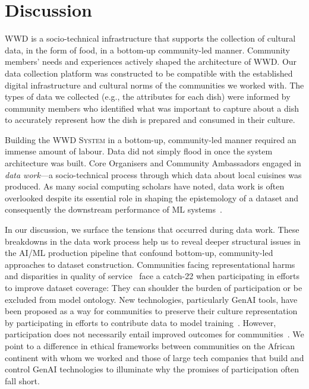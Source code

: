 \section{Discussion}
\label{sec:discussion}
\textsc{WWD} is a socio-technical infrastructure that supports the collection of cultural data, in the form of food, in a bottom-up community-led manner. Community members' needs and experiences actively shaped the architecture of WWD. Our data collection platform was constructed to be compatible with the established digital infrastructure and cultural norms of the communities we worked with. The types of data we collected (e.g., the attributes for each dish) were informed by community members who identified what was important to capture about a dish to accurately represent how the dish is prepared and consumed in their culture. 

Building the \textsc{WWD System} in a bottom-up, community-led manner required an immense amount of labour. Data did not simply flood in once the system architecture was built. Core Organisers and Community Ambassadors engaged in \textit{data work}---a socio-technical process through which data about local cuisines was produced. As many social computing scholars have noted, data work is often overlooked despite its essential role in shaping the epistemology of a dataset and consequently the downstream performance of ML systems~\cite{sambasivan2021everyone,ismailEngagingSolidarityData2018,mollerWhoDoesWork2020,scheuermanProductsPositionalityHow2024}. 

In our discussion, we surface the tensions that occurred during data work. These breakdowns in the data work process help us to reveal deeper structural issues in the AI/ML production pipeline that confound bottom-up, community-led approaches to dataset construction. Communities facing representational harms~\cite{weidinger2021ethical} and disparities in quality of service~\cite{shankar2017allocational, de2019doescvworkallocational} face a catch-22 when participating in efforts to improve dataset coverage: They can shoulder the burden of participation or be excluded from model ontology. New technologies, particularly GenAI tools, have been proposed as a way for communities to preserve their culture representation by participating in efforts to contribute data to model training~\cite{heritage7030070}. However, participation does not necessarily entail improved outcomes for communities~\cite{birhanePowerPeopleOpportunities2022}. We point to a difference in ethical frameworks between communities on the African continent with whom we worked and those of large tech companies that build and control GenAI technologies to illuminate why the promises of participation often fall short. 


